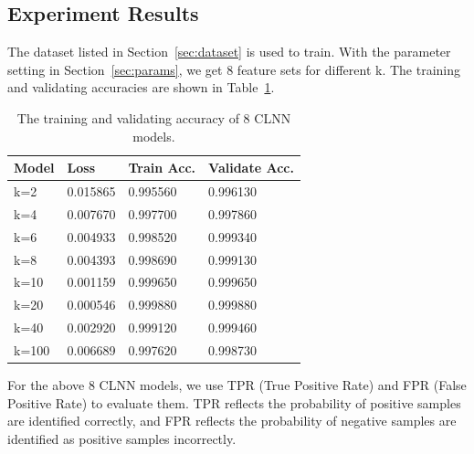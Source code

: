\documentclass[conference]{IEEEtran}
\begin{document}
\subsection{Experiment Results}
\label{sec:experimentresults}
The dataset listed in Section~\ref{sec:dataset} is used to train. With the parameter setting in Section~\ref{sec:params}, we get 8 feature sets for different k. The training and validating accuracies are shown in Table~\ref{tab:acc4models}.
\begin{table}
  \caption{The training and validating accuracy of 8 CLNN models.}
  \label{tab:acc4models}
  \centering
  \begin{tabular}{l l l l}
    \hline
    \textbf{Model} & \textbf{Loss} & \textbf{Train Acc.}&\textbf{Validate Acc.}\\
    \hline
    k=2      & 0.015865  & 0.995560  &0.996130  \\
    k=4      & 0.007670  & 0.997700  &0.997860 \\
    k=6      & 0.004933  & 0.998520  &0.999340 \\
    k=8      & 0.004393  & 0.998690  &0.999130 \\
    k=10     & 0.001159  & 0.999650  &0.999650  \\
    k=20     & 0.000546  & 0.999880  &0.999880 \\
    k=40     & 0.002920  & 0.999120  &0.999460  \\
    k=100    & 0.006689  & 0.997620  &0.998730  \\
    \hline
  \end{tabular}
\end{table}

For the above 8 CLNN models, we use TPR (True Positive Rate) and FPR (False Positive Rate) to evaluate them. TPR reflects the probability of positive samples are identified correctly, and FPR reflects the probability of negative samples are identified as positive samples incorrectly. 
\end{document}
